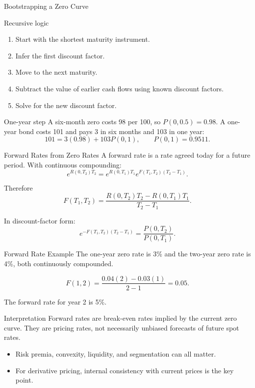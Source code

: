 \documentclass[aspectratio=169,11pt]{beamer}
\begin{document}
\begin{frame}{Bootstrapping a Zero Curve}
    \begin{block}{Recursive logic}
        \begin{enumerate}
            \item Start with the shortest maturity instrument.
            \item Infer the first discount factor.
            \item Move to the next maturity.
            \item Subtract the value of earlier cash flows using known discount factors.
            \item Solve for the new discount factor.
        \end{enumerate}
    \end{block}

    \begin{exampleblock}{One-year step}
        A six-month zero costs 98 per 100, so \(P(0,0.5)=0.98\).
        A one-year bond costs 101 and pays 3 in six months and 103 in one year:
        \[
            101=3(0.98)+103P(0,1),
            \qquad
            P(0,1)=0.9511.
        \]
    \end{exampleblock}
\end{frame}

\begin{frame}{Forward Rates from Zero Rates}
    A forward rate is a rate agreed today for a future period.
    With continuous compounding:
    \[
        e^{R(0,T_2)T_2}
        =
        e^{R(0,T_1)T_1}e^{F(T_1,T_2)(T_2-T_1)}.
    \]

    Therefore
    \[
        F(T_1,T_2)=
        \frac{R(0,T_2)T_2-R(0,T_1)T_1}{T_2-T_1}.
    \]

    In discount-factor form:
    \[
        e^{-F(T_1,T_2)(T_2-T_1)}
        =
        \frac{P(0,T_2)}{P(0,T_1)}.
    \]
\end{frame}

\begin{frame}{Forward Rate Example}
    The one-year zero rate is 3\% and the two-year zero rate is 4\%, both continuously compounded.

    \[
        F(1,2)=\frac{0.04(2)-0.03(1)}{2-1}=0.05.
    \]

    The forward rate for year 2 is 5\%.

    \begin{block}{Interpretation}
        Forward rates are break-even rates implied by the current zero curve.
        They are pricing rates, not necessarily unbiased forecasts of future spot rates.
    \end{block}

    \begin{itemize}
        \item Risk premia, convexity, liquidity, and segmentation can all matter.
        \item For derivative pricing, internal consistency with current prices is the key point.
    \end{itemize}
\end{frame}
\end{document}
